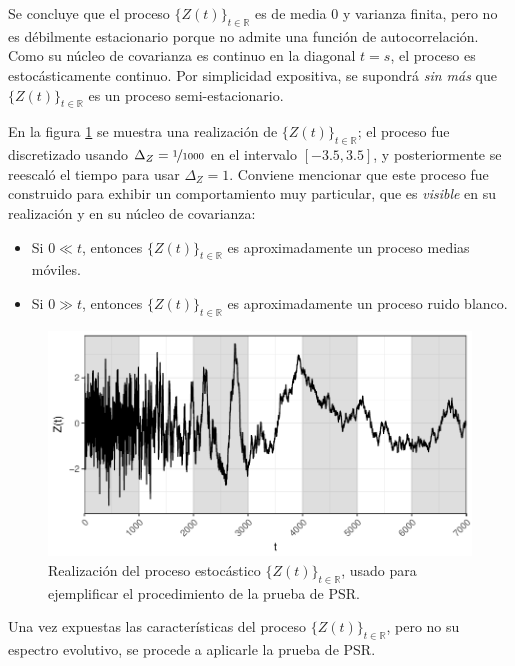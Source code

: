 \documentclass[12pt,letterpaper]{book}
\newcommand{\R}{\mathbb{R}}
\begin{document}
Se concluye que el proceso $\{Z(t)\}_{t\in\R}$ es de media 0 y varianza finita, pero no es débilmente estacionario porque no admite una función de autocorrelación.
%
Como su núcleo de covarianza es continuo en la diagonal $t=s$, el proceso es estocásticamente continuo.
%
Por simplicidad expositiva, se supondrá \textit{sin más} que $\{Z(t)\}_{t\in\R}$ es un proceso semi-estacionario.

En la figura \ref{fig:lazy21} se muestra una realización de $\{Z(t)\}_{t\in\R}$; el proceso fue discretizado usando $\Delta_Z=\nicefrac{1}{1000}$ en el intervalo $[-3.5,3.5]$, y posteriormente se reescaló el tiempo para usar $\Delta_Z=1$.
%
Conviene mencionar que este proceso fue construido para exhibir un comportamiento muy particular, que es \textit{visible} en su realización y en su núcleo de covarianza: 
\begin{itemize}
\item Si $0 \ll t$, entonces $\{Z(t)\}_{t\in\R}$ es aproximadamente un proceso medias móviles.
\item Si $0 \gg t$, entonces $\{Z(t)\}_{t\in\R}$ es aproximadamente un proceso ruido blanco.
\end{itemize}

\begin{figure}
\centering
\includegraphics[width=0.9\linewidth]{./scripts_graf_res/proceso_Z.pdf}
\caption[Realización de un proceso estocástico, usado para ejemplificar la prueba de Priestley-Subba Rao]{Realización del proceso estocástico $\{Z(t)\}_{t\in\R}$, usado para ejemplificar el procedimiento de la prueba de PSR.}
\label{fig:lazy21}
\end{figure}

Una vez expuestas las características del proceso $\{Z(t)\}_{t\in\R}$, pero no su espectro evolutivo, se procede a aplicarle la prueba de PSR.

\end{document}
